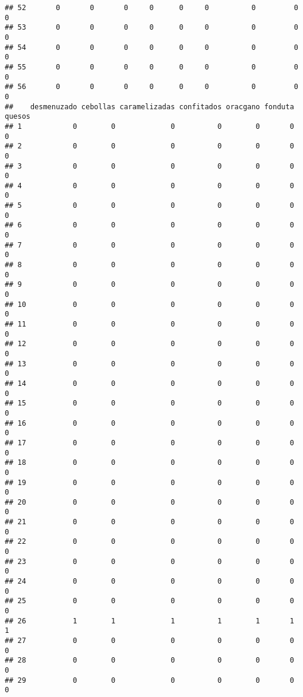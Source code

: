 \documentclass[
]{article}
\begin{document}
\begin{verbatim}
## 52       0       0       0     0      0     0          0         0        0
## 53       0       0       0     0      0     0          0         0        0
## 54       0       0       0     0      0     0          0         0        0
## 55       0       0       0     0      0     0          0         0        0
## 56       0       0       0     0      0     0          0         0        0
##    desmenuzado cebollas caramelizadas confitados oracgano fonduta quesos
## 1            0        0             0          0        0       0      0
## 2            0        0             0          0        0       0      0
## 3            0        0             0          0        0       0      0
## 4            0        0             0          0        0       0      0
## 5            0        0             0          0        0       0      0
## 6            0        0             0          0        0       0      0
## 7            0        0             0          0        0       0      0
## 8            0        0             0          0        0       0      0
## 9            0        0             0          0        0       0      0
## 10           0        0             0          0        0       0      0
## 11           0        0             0          0        0       0      0
## 12           0        0             0          0        0       0      0
## 13           0        0             0          0        0       0      0
## 14           0        0             0          0        0       0      0
## 15           0        0             0          0        0       0      0
## 16           0        0             0          0        0       0      0
## 17           0        0             0          0        0       0      0
## 18           0        0             0          0        0       0      0
## 19           0        0             0          0        0       0      0
## 20           0        0             0          0        0       0      0
## 21           0        0             0          0        0       0      0
## 22           0        0             0          0        0       0      0
## 23           0        0             0          0        0       0      0
## 24           0        0             0          0        0       0      0
## 25           0        0             0          0        0       0      0
## 26           1        1             1          1        1       1      1
## 27           0        0             0          0        0       0      0
## 28           0        0             0          0        0       0      0
## 29           0        0             0          0        0       0      0

\end{verbatim}
\end{document}
